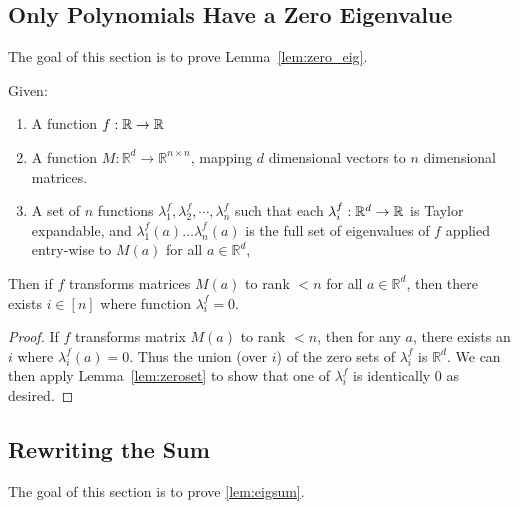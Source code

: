 \subsection{Only Polynomials Have a Zero Eigenvalue}\label{sec:zero_eig}

The goal of this section is to prove Lemma~\ref{lem:zero_eig}.
\begin{lemma}\label{lem:zero_eig}
Given:
\begin{enumerate} 
\item A function $f : {\mathbb R} \rightarrow {\mathbb R}$ 
\item A function $M: \mathbb{R}^d \rightarrow \mathbb{R}^{n \times n}$, mapping $d$ dimensional vectors to $n$ dimensional matrices.
\item A set of $n$ functions $\lambda^f_1, \lambda^f_2, \cdots, \lambda^f_n$
such that each $\lambda^f_i : {\mathbb R}^d \rightarrow {\mathbb R}$ is Taylor expandable, and $\lambda^f_1(a) \ldots \lambda^f_n(a)$ is the full set of eigenvalues of $f$ applied entry-wise to $M(a)$ for all $a \in \mathbb{R}^d$,
\end{enumerate}

Then if $f$ transforms matrices $M(a)$ to rank $< n$ for all $a \in \mathbb{R}^d$, then there exists $i \in [n]$ where function $\lambda^f_i = 0$.
\end{lemma}

\begin{proof} 
If $f$ transforms matrix $M(a)$ to rank $<n$, then for any $a$,  there exists an $i$ where $\lambda^f_i(a)=0$. Thus the union (over $i$) of the zero sets of $\lambda^f_i$ is $\mathbb{R}^d$. We can then apply Lemma~\ref{lem:zeroset} to show that one of $\lambda^f_i$ is identically $0$ as desired.
\end{proof}








\subsection{Rewriting the Sum}\label{sec:eigsum}

The goal of this section is to prove \ref{lem:eigsum}. 

